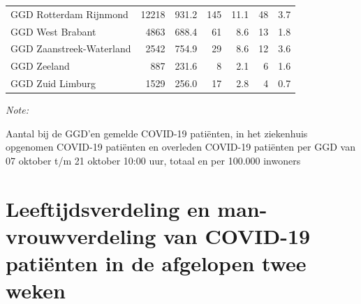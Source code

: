 \documentclass[
  english,
  man,floatsintext]{apa6}
\begin{document}
\begin{table}[H]
\begin{threeparttable}
\begin{tabular}{lrrrrrr}
GGD Rotterdam Rijnmond & 12218 & 931.2 & 145 & 11.1 & 48 & 3.7\\
GGD West Brabant & 4863 & 688.4 & 61 & 8.6 & 13 & 1.8\\
GGD Zaanstreek-Waterland & 2542 & 754.9 & 29 & 8.6 & 12 & 3.6\\
GGD Zeeland & 887 & 231.6 & 8 & 2.1 & 6 & 1.6\\
GGD Zuid Limburg & 1529 & 256.0 & 17 & 2.8 & 4 & 0.7\\
\bottomrule
\end{tabular}
\begin{tablenotes}
\item \textit{Note: } 
\item Aantal bij de GGD’en gemelde COVID-19 patiënten, in het ziekenhuis opgenomen COVID-19 patiënten en overleden COVID-19 patiënten per GGD van 07 oktober t/m 21 oktober 10:00 uur, totaal en per 100.000 inwoners
\end{tablenotes}
\end{threeparttable}
\endgroup{}
\end{table}

\newpage

\hypertarget{leeftijdsverdeling-en-man-vrouwverdeling-van-covid-19-patiuxebnten-in-de-afgelopen-twee-weken}{%
\section{Leeftijdsverdeling en man-vrouwverdeling van COVID-19 patiënten in de afgelopen twee weken}\label{leeftijdsverdeling-en-man-vrouwverdeling-van-covid-19-patiuxebnten-in-de-afgelopen-twee-weken}}
\end{document}
